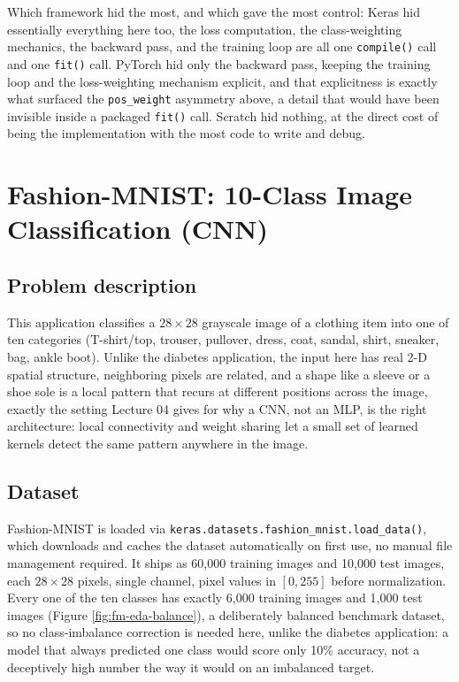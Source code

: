 \documentclass[11pt]{article}
\newcommand{\code}[1]{\texttt{#1}}
\begin{document}
Which framework hid the most, and which gave the most control: Keras hid
essentially everything here too, the loss computation, the class-weighting
mechanics, the backward pass, and the training loop are all one
\code{compile()} call and one \code{fit()} call. PyTorch hid only the
backward pass, keeping the training loop and the loss-weighting mechanism
explicit, and that explicitness is exactly what surfaced the
\code{pos\_weight} asymmetry above, a detail that would have been invisible
inside a packaged \code{fit()} call. Scratch hid nothing, at the direct cost
of being the implementation with the most code to write and debug.

\newpage
\section{Fashion-MNIST: 10-Class Image Classification (CNN)}
\label{sec:fashion}

\subsection{Problem description}

This application classifies a $28\times28$ grayscale image of a clothing item
into one of ten categories (T-shirt/top, trouser, pullover, dress, coat,
sandal, shirt, sneaker, bag, ankle boot). Unlike the diabetes application,
the input here has real 2-D spatial structure, neighboring pixels are
related, and a shape like a sleeve or a shoe sole is a local pattern that
recurs at different positions across the image, exactly the setting Lecture
04 gives for why a CNN, not an MLP, is the right architecture: local
connectivity and weight sharing let a small set of learned kernels detect the
same pattern anywhere in the image.

\subsection{Dataset}

Fashion-MNIST is loaded via \code{keras.datasets.fashion\_mnist.load\_data()},
which downloads and caches the dataset automatically on first use, no manual
file management required. It ships as 60,000 training images and 10,000 test
images, each $28\times28$ pixels, single channel, pixel values in $[0, 255]$
before normalization. Every one of the ten classes has exactly 6,000 training
images and 1,000 test images (Figure \ref{fig:fm-eda-balance}), a
deliberately balanced benchmark dataset, so no class-imbalance correction is
needed here, unlike the diabetes application: a model that always predicted
one class would score only 10\% accuracy, not a deceptively high number the
way it would on an imbalanced target.
\end{document}
